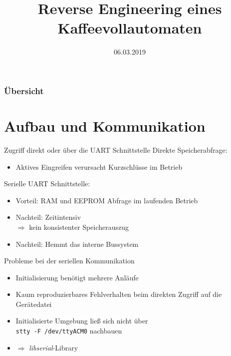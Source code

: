 \documentclass[
  de, %
  inputenc=utf8,
]{tuhhslides}
\title[Reverse Engineering eines Kaffeevollautomaten]{Reverse Engineering eines\\Kaffeevollautomaten}
\author[]{\speaker{Niklas Joachim Eberhard Kr\"uger}}
\institute{InstSchoolOfEEIT}
\date{06.03.2019}
\begin{document}
\begin{frame}
    \titlepage
\end{frame}

\begin{frame}
    \frametitle{\"Ubersicht}
    \tableofcontents
\end{frame}



\section{Aufbau und Kommunikation}
\begin{frame}{Zugriff direkt oder über die UART Schnittstelle}
  Direkte Speicherabfrage:
  \begin{itemize}
    \item Aktives Eingreifen verursacht Kurzschlüsse im Betrieb
  \end{itemize}
  \vspace{1cm}
  Serielle UART Schnittstelle:
  \begin{itemize}
    \item Vorteil: RAM und EEPROM Abfrage im laufenden Betrieb
    \item Nachteil: Zeitintensiv\\\hspace{1.5cm}$\Rightarrow$ kein konsistenter Speicherauszug
    \item Nachteil: Hemmt das interne Bussystem
  \end{itemize}
\end{frame}

\begin{frame}
  \begin{center}
  \end{center}
\end{frame}
\begin{frame}{Probleme bei der seriellen Kommunikation}
  \begin{itemize}
    \item Initialisierung benötigt mehrere Anläufe
    \item Kaum reproduzierbares Fehlverhalten beim direkten Zugriff auf die Gerätedatei
    \item Initialisierte Umgebung ließ sich nicht über\\\texttt{stty -F /dev/ttyACM0} nachbauen
    \item $\Rightarrow$ \textit{libserial}-Library
  \end{itemize}
\end{frame}
\end{document}
